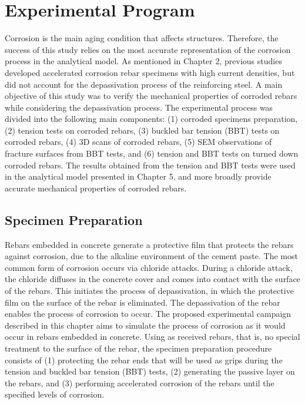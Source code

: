 \chapter{Experimental Program}
\label{chap-three}

Corrosion is the main aging condition that affects structures. Therefore, the success of this study relies on the most accurate representation of the corrosion process in the analytical model. As mentioned in Chapter 2, previous studies developed accelerated corrosion rebar specimens with high current densities, but did not account for the depassivation process of the reinforcing steel. A main objective of this study was to verify the mechanical properties of corroded rebars while considering the depassivation process. The experimental process was divided into the following main components: (1) corroded specimens preparation, (2) tension tests on corroded rebars, (3) buckled bar tension (BBT) tests on corroded rebars, (4) 3D scans of corroded rebars, (5) SEM observations of fracture surfaces from BBT tests, and (6) tension and BBT tests on turned down corroded rebars. The results obtained from the tension and BBT tests were used  in the analytical model presented in Chapter 5, and more broadly provide accurate mechanical properties of corroded rebars.

\section{Specimen Preparation}

Rebars embedded in concrete generate a protective film that protects the rebars against corrosion, due to the alkaline environment of the cement paste. The most common form of corrosion occurs via chloride attacks. During a chloride attack, the chloride diffuses in the concrete cover and comes into contact with the surface of the rebars. This initiates the process of depassivation,    in which the protective film on the surface of the rebar is eliminated. The depassivation of the rebar enables the process of corrosion to occur. The proposed experimental campaign described in this chapter aims to simulate the process of corrosion as it would occur in rebars embedded   in concrete. Using as received rebars, that is, no special treatment to the surface of the rebar, the specimen preparation procedure consists of (1) protecting the rebar ends that will be used as grips during the tension and buckled bar tension (BBT) tests, (2) generating the passive layer on the rebars, and (3) performing accelerated corrosion of the rebars until the specified levels of corrosion.

